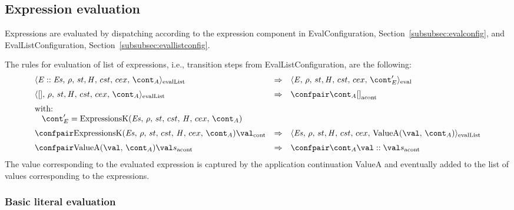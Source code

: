 \documentclass{article}
\begin{document}
\subsection{Expression evaluation}
\label{subsec:expr-evaluation}
\newcommand{\ExpressionsK}[6]{\mathrm{ExpressionsK}({#1},\,{#2},\,{#3},\,{#4},\,{\handler},\,{#5},\,{#6})}
\newcommand{\ValueA}[2]{\mathrm{ValueA}({#1},\,{#2})}

Expressions are evaluated by dispatching according to the expression component in EvalConfiguration, Section~\ref{subsubsec:evalconfig}, and EvalListConfiguration, Section~\ref{subsubsec:evallistconfig}.

\noindent
The rules for evaluation of list of expressions, i.e., transition steps from EvalListConfiguration, are the following:
\label{subsec:eval-list-expressions}
\[
  \begin{array}{lcl}
	\cesktrans{
		\evallistconf{\expr :: \exprs}{\env}{\strace}{\cstrace}{\cex}{\acont}}{
		\evalconf{\expr}{\env}{\strace}{\cstrace}{\cex}{\econt'}}
		\\[2mm]

	\cesktrans{
		\evallistconf{[]}{\env}{\strace}{\cstrace}{\cex}{\acont}}{
		\acontconf{\acont}{[]}}
		\\[2mm]
	\textrm{with:}\\
	\hspace{3mm}\econt' = \ExpressionsK{\exprs}{\env}{\strace}{\cstrace}{\cex}{\acont}
	\\[2mm]

	\cesktrans{
		\contconf{\ExpressionsK{\exprs}{\env}{\strace}{\cstrace}{\cex}{\acont}}{\val}}{
		\evallistconf{\exprs}{\env}{\strace}{\cstrace}{\cex}{\ValueA{\val}{\acont}}}
		\\[2mm]

	\cesktrans{
		\acontconf{\ValueA{\val}{\acont}}{\val s}}{
		\acontconf{\acont}{\val :: \val s}}

  \end{array}
\]
The value corresponding to the evaluated expression is captured by the application continuation ValueA and eventually added to the list of values corresponding to the expressions.
\subsubsection{Basic literal evaluation}
\label{subsubsec:basic-literal-eval}
\end{document}
